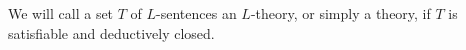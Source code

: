 We will call a set $T$ of $L$-sentences an $L$-theory, or simply a theory, if $T$ is satisfiable and deductively closed.
